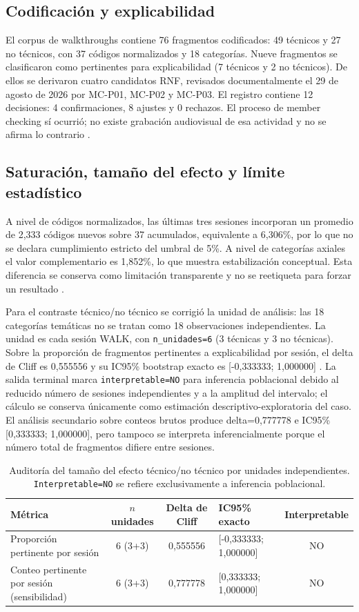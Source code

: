 \documentclass[11pt,a4paper,twoside]{article}
\begin{document}
\subsection{Codificación y explicabilidad}
El corpus de walkthroughs contiene 76 fragmentos codificados: 49 técnicos y 27 no técnicos, con 37 códigos normalizados y 18 categorías. Nueve fragmentos se clasificaron como pertinentes para explicabilidad (7 técnicos y 2 no técnicos). De ellos se derivaron cuatro candidatos RNF, revisados documentalmente el 29 de agosto de 2026 por MC-P01, MC-P02 y MC-P03. El registro contiene 12 decisiones: 4 confirmaciones, 8 ajustes y 0 rechazos. El proceso de member checking sí ocurrió; no existe grabación audiovisual de esa actividad y no se afirma lo contrario \cite{birt2016}.

\subsection{Saturación, tamaño del efecto y límite estadístico}
A nivel de códigos normalizados, las últimas tres sesiones incorporan un promedio de 2,333 códigos nuevos sobre 37 acumulados, equivalente a 6,306\%, por lo que no se declara cumplimiento estricto del umbral de 5\%. A nivel de categorías axiales el valor complementario es 1,852\%, lo que muestra estabilización conceptual. Esta diferencia se conserva como limitación transparente y no se reetiqueta para forzar un resultado \cite{hennink2017}.

Para el contraste técnico/no técnico se corrigió la unidad de análisis: las 18 categorías temáticas no se tratan como 18 observaciones independientes. La unidad es cada sesión WALK, con \texttt{n\_unidades=6} (3 técnicas y 3 no técnicas). Sobre la proporción de fragmentos pertinentes a explicabilidad por sesión, el delta de Cliff es 0,555556 y su IC95\% bootstrap exacto es [-0,333333; 1,000000] \cite{cliff1993}. La salida terminal marca \texttt{interpretable=NO} para inferencia poblacional debido al reducido número de sesiones independientes y a la amplitud del intervalo; el cálculo se conserva únicamente como estimación descriptivo-exploratoria del caso. El análisis secundario sobre conteos brutos produce delta=0,777778 e IC95\% [0,333333; 1,000000], pero tampoco se interpreta inferencialmente porque el número total de fragmentos difiere entre sesiones.

\begin{table}[H]\centering\small
\begin{tabularx}{\textwidth}{p{4.8cm}c c p{3.4cm}c}\toprule
Métrica & $n$ unidades & Delta de Cliff & IC95\% exacto & Interpretable \\ \midrule
Proporción pertinente por sesión & 6 (3+3) & 0,555556 & [-0,333333; 1,000000] & NO \\
Conteo pertinente por sesión (sensibilidad) & 6 (3+3) & 0,777778 & [0,333333; 1,000000] & NO \\ \bottomrule
\end{tabularx}
\caption{Auditoría del tamaño del efecto técnico/no técnico por unidades independientes. \texttt{Interpretable=NO} se refiere exclusivamente a inferencia poblacional.}\label{tab:efecto-perfiles}
\end{table}
\end{document}
